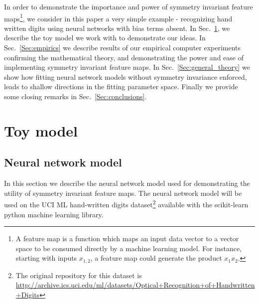 \documentclass[twocolumn, nofootinbib, aps, prb]{revtex4-1}
\begin{document}
In order to demonstrate the importance and power of symmetry invariant feature maps\footnote{A feature map is a function which maps an input data vector to a vector space to be consumed directly by a machine learning model. For instance, starting with inputs $x_{1,2}$, a feature map could generate the product $x_1 x_2$.}, we consider in this paper a very simple example - recognizing hand written digits using neural networks with bias terms absent. In Sec.~\ref{Sec:model}, we describe the toy model we work with to demonstrate our ideas. In Sec.~\ref{Sec:empirics} we describe results of our empirical computer experiments confirming the mathematical theory, and demonstrating the power and ease of implementing symmetry invariant feature maps. In Sec.~\ref{Sec:general_theory} we show how fitting neural network models without symmetry invariance enforced, leads to shallow directions in the fitting parameter space. Finally we provide some closing remarks in Sec.~\ref{Sec:conclusions}.





\section{Toy model}\label{Sec:model}
\subsection{Neural network model}\label{Sec:dumb_NN}

In this section we describe the neural network model used for demonstrating the utility of symmetry invariant feature maps. The neural network model will be used on the UCI ML hand-written digits dataset\footnote{The original repository for this dataset\cite{Dua:2017} is \url{http://archive.ics.uci.edu/ml/datasets/Optical+Recognition+of+Handwritten+Digits}} available with the scikit-learn python machine learning library\cite{scikit-learn}.
\end{document}
